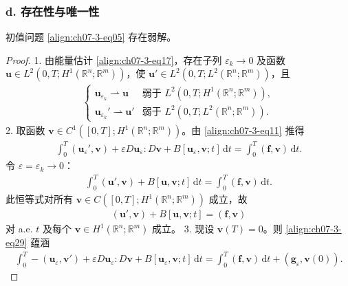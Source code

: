 \documentclass[../../main.tex]{subfiles}
\begin{document}
\subsubsection*{d. 存在性与唯一性}\label{subsubsection:ch07-3-2-d-存在唯一}

\begin{theorem}[弱解的存在性]\label{theorem:ch07-3-3-弱解存在}
初值问题 \eqref{align:ch07-3-eq05} 存在弱解。
\begin{proof}
1. 由能量估计 \eqref{align:ch07-3-eq17}，存在子列 $\varepsilon_k\to 0$ 及函数 $\mathbf{u}\in L^2(0,T;H^1(\mathbb{R}^n;\mathbb{R}^m))$，使 $\mathbf{u}'\in L^2(0,T;L^2(\mathbb{R}^n;\mathbb{R}^m))$，且
\begin{align}
\begin{cases}
\mathbf{u}_{\varepsilon_k}\rightharpoonup\mathbf{u}&\text{弱于 }L^2(0,T;H^1(\mathbb{R}^n;\mathbb{R}^m)),\\
\mathbf{u}_{\varepsilon_k}{}'\rightharpoonup\mathbf{u}'&\text{弱于 }L^2(0,T;L^2(\mathbb{R}^n;\mathbb{R}^m)).
\end{cases}\label{align:ch07-3-eq28}
\end{align}
2. 取函数 $\mathbf{v}\in C^1([0,T];H^1(\mathbb{R}^n;\mathbb{R}^m))$。由 \eqref{align:ch07-3-eq11} 推得
\begin{align}
\int_0^T(\mathbf{u}_\varepsilon{}',\mathbf{v})+\varepsilon D\mathbf{u}_\varepsilon:D\mathbf{v}+B[\mathbf{u}_\varepsilon,\mathbf{v};t]\,\mathrm{d}t=\int_0^T(\mathbf{f},\mathbf{v})\,\mathrm{d}t.\label{align:ch07-3-eq29}
\end{align}
令 $\varepsilon=\varepsilon_k\to 0$：
\begin{align}
\int_0^T(\mathbf{u}',\mathbf{v})+B[\mathbf{u},\mathbf{v};t]\,\mathrm{d}t=\int_0^T(\mathbf{f},\mathbf{v})\,\mathrm{d}t.\label{align:ch07-3-eq30}
\end{align}
此恒等式对所有 $\mathbf{v}\in C([0,T];H^1(\mathbb{R}^n;\mathbb{R}^m))$ 成立，故
\begin{align*}
(\mathbf{u}',\mathbf{v})+B[\mathbf{u},\mathbf{v};t]=(\mathbf{f},\mathbf{v})
\end{align*}
对 a.e. $t$ 及每个 $\mathbf{v}\in H^1(\mathbb{R}^n;\mathbb{R}^m)$ 成立。
3. 现设 $\mathbf{v}(T)=0$。则 \eqref{align:ch07-3-eq29} 蕴涵
\begin{align*}
\int_0^T-(\mathbf{u}_\varepsilon,\mathbf{v}')+\varepsilon D\mathbf{u}_\varepsilon:D\mathbf{v}+B[\mathbf{u}_\varepsilon,\mathbf{v};t]\,\mathrm{d}t=\int_0^T(\mathbf{f},\mathbf{v})\,\mathrm{d}t+(\mathbf{g}_\varepsilon,\mathbf{v}(0)).
\end{align*}

\end{proof}
\end{theorem}
\end{document}
